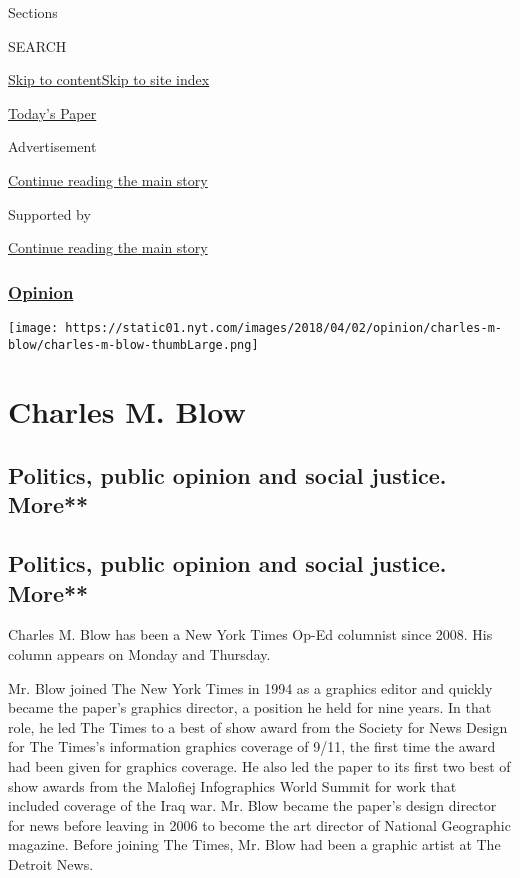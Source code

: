 Sections

SEARCH

\protect\hyperlink{site-content}{Skip to
content}\protect\hyperlink{site-index}{Skip to site index}

\href{https://myaccount.nytimes.com/auth/login?response_type=cookie\&client_id=vi}{}

\href{https://www.nytimes.com/section/todayspaper}{Today's Paper}

Advertisement

\protect\hyperlink{after-top}{Continue reading the main story}

Supported by

\protect\hyperlink{after-sponsor}{Continue reading the main story}

\hypertarget{opinion}{%
\subsubsection{\texorpdfstring{\href{/section/opinion}{Opinion}}{Opinion}}\label{opinion}}

\texttt{[image: https://static01.nyt.com/images/2018/04/02/opinion/charles-m-blow/charles-m-blow-thumbLarge.png]}

\hypertarget{charles-m-blow}{%
\section{Charles M. Blow}\label{charles-m-blow}}

\hypertarget{politics-public-opinion-and-social-justice-more}{%
\subsection{Politics, public opinion and social justice.
More**}\label{politics-public-opinion-and-social-justice-more}}

\hypertarget{politics-public-opinion-and-social-justice-more-1}{%
\subsection{Politics, public opinion and social justice.
More**}\label{politics-public-opinion-and-social-justice-more-1}}

Charles M. Blow has been a New York Times Op-Ed columnist since 2008.
His column appears on Monday and Thursday.

Mr. Blow joined The New York Times in 1994 as a graphics editor and
quickly became the paper's graphics director, a position he held for
nine years. In that role, he led The Times to a best of show award from
the Society for News Design for The Times's information graphics
coverage of 9/11, the first time the award had been given for graphics
coverage. He also led the paper to its first two best of show awards
from the Malofiej Infographics World Summit for work that included
coverage of the Iraq war. Mr. Blow became the paper's design director
for news before leaving in 2006 to become the art director of National
Geographic magazine. Before joining The Times, Mr. Blow had been a
graphic artist at The Detroit News.

